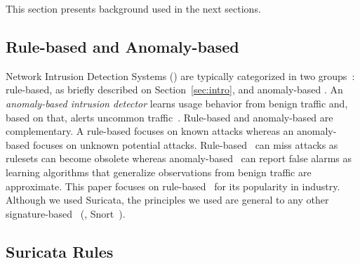 \documentclass[conference]{IEEEtran}
\begin{document}
This section presents background used in the next sections.

\subsection{Rule-based and Anomaly-based \nids}

\sloppy Network Intrusion Detection Systems (\nids{}) are typically
categorized in two groups~\cite{kumar2007survey}: rule-based, as
briefly described on Section~\ref{sec:intro}, and anomaly-based
\nids. An \emph{anomaly-based intrusion detector} learns usage
behavior from benign traffic and, based on that, alerts uncommon
traffic~\cite{7579764,kumar2007survey,Mitchell:2014:SID:2597757.2542049,cordy-etal-issta19}. Rule-based
\nids{} and anomaly-based \nids{} are complementary. A rule-based
\nids{} focuses on known attacks whereas an anomaly-based \nids{}
focuses on unknown potential attacks. Rule-based \nids\ can miss
attacks as rulesets can become obsolete whereas anomaly-based
\nids\ can report false alarms as learning algorithms that generalize
observations from benign traffic are approximate.  This paper focuses
on rule-based \nids\ for its popularity in industry. Although we used
Suricata, the principles we used are general to any other
signature-based \nids~(\eg{}, Snort~\cite{snort}).




\subsection{Suricata Rules}
\label{sec:example-suricata-rules}

\end{document}
